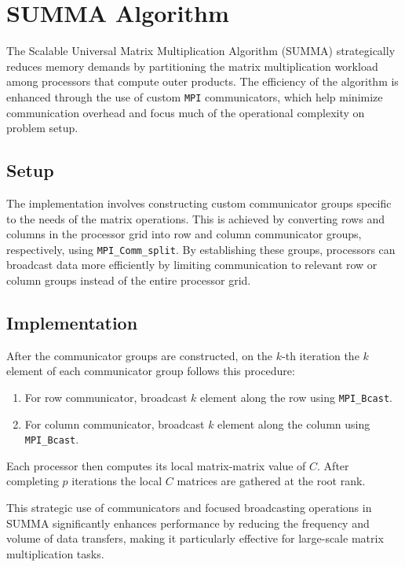 \documentclass{article}
\begin{document}
\section{SUMMA Algorithm}
The Scalable Universal Matrix Multiplication Algorithm (SUMMA) strategically reduces memory demands by partitioning the matrix multiplication workload among processors that compute outer products. The efficiency of the algorithm is enhanced through the use of custom \texttt{MPI} communicators, which help minimize communication overhead and focus much of the operational complexity on problem setup.

\subsection{Setup}
The implementation involves constructing custom communicator groups specific to the needs of the matrix operations. This is achieved by converting rows and columns in the processor grid into row and column communicator groups, respectively, using \texttt{MPI\_Comm\_split}. By establishing these groups, processors can broadcast data more efficiently by limiting communication to relevant row or column groups instead of the entire processor grid.

\subsection{Implementation}
After the communicator groups are constructed, on the \(k\)-th iteration the \(k \) element of each communicator group follows this procedure:
    \begin{enumerate}
        \item For row communicator, broadcast \( k\) element along the row using \texttt{MPI\_Bcast}.
        \item For column communicator, broadcast \( k\) element along the column using \texttt{MPI\_Bcast}. 
    \end{enumerate}

\bigskip
\noindent
Each processor then computes its local matrix-matrix value of \( C\). After completing $p$ iterations the local \( C\) matrices are gathered at the root rank.

\bigskip
\noindent
This strategic use of communicators and focused broadcasting operations in SUMMA significantly enhances performance by reducing the frequency and volume of data transfers, making it particularly effective for large-scale matrix multiplication tasks.
\end{document}
